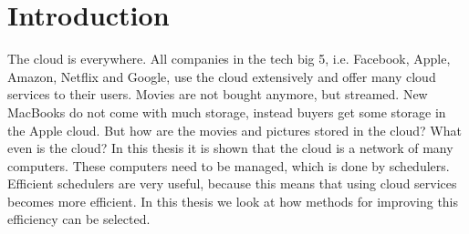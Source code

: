 \chapter{Introduction}





The cloud is everywhere. All companies in the tech big 5, i.e. Facebook,
Apple, Amazon, Netflix and Google, use the cloud extensively and offer many cloud
services to their users. Movies are not bought anymore, but streamed. New
MacBooks do not come with much storage, instead buyers get some storage in the
Apple cloud. But how are the movies and pictures stored in the cloud? What
even is the cloud? In this thesis it is shown that the cloud is a network of
many computers. These computers need to be managed, which is done by
schedulers. Efficient schedulers are very useful, because this means that using
cloud services becomes more efficient. In this thesis we look at how methods
for improving this efficiency can be selected.

